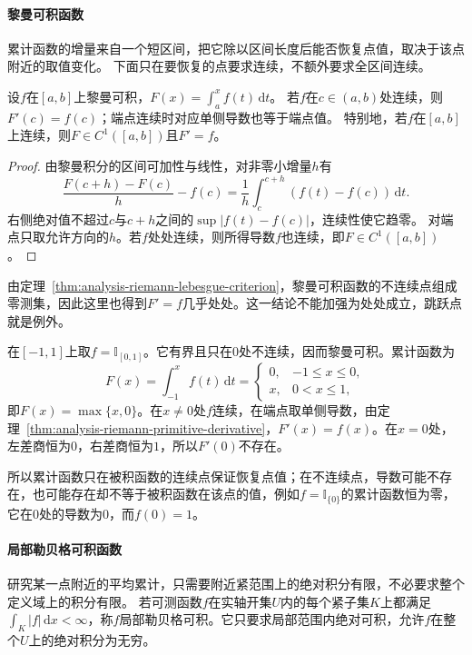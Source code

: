 \paragraph{黎曼可积函数}
累计函数的增量来自一个短区间，把它除以区间长度后能否恢复点值，取决于该点附近的取值变化。
下面只在要恢复的点要求连续，不额外要求全区间连续。
\begin{theorem}[黎曼累计函数在连续点的导数]
\label{thm:analysis-riemann-primitive-derivative}
设$f$在$[a,b]$上黎曼可积，$F(x)=\int_a^xf(t)\,\mathrm dt$。
若$f$在$c\in(a,b)$处连续，则$F'(c)=f(c)$；端点连续时对应单侧导数也等于端点值。
特别地，若$f$在$[a,b]$上连续，则$F\in C^1([a,b])$且$F'=f$。
\end{theorem}
\begin{proof}
由黎曼积分的区间可加性与线性，对非零小增量$h$有
\[
 \frac{F(c+h)-F(c)}h-f(c)
 =\frac1h\int_c^{c+h}(f(t)-f(c))\,\mathrm dt.
\]
右侧绝对值不超过$c$与$c+h$之间的$\sup|f(t)-f(c)|$，连续性使它趋零。
对端点只取允许方向的$h$。若$f$处处连续，则所得导数$f$也连续，即$F\in C^1([a,b])$。
\end{proof}

由定理~\ref{thm:analysis-riemann-lebesgue-criterion}，黎曼可积函数的不连续点组成零测集，因此这里也得到$F'=f$几乎处处。这一结论不能加强为处处成立，跳跃点就是例外。
\begin{example}[阶跃函数的累计函数在跳跃点不可导]
\label{ex:analysis-step-primitive}
在$[-1,1]$上取$f=\mathbb I_{[0,1]}$。它有界且只在$0$处不连续，因而黎曼可积。累计函数为
\[
 F(x)=\int_{-1}^xf(t)\,\mathrm dt=
 \begin{cases}
  0,&-1\leq x\leq0,\\
  x,&0<x\leq1,
 \end{cases}
\]
即$F(x)=\max\{x,0\}$。在$x\neq0$处$f$连续，在端点取单侧导数，由定理~\ref{thm:analysis-riemann-primitive-derivative}，$F'(x)=f(x)$。在$x=0$处，左差商恒为$0$，右差商恒为$1$，所以$F'(0)$不存在。
\end{example}
所以累计函数只在被积函数的连续点保证恢复点值；在不连续点，导数可能不存在，也可能存在却不等于被积函数在该点的值，例如$f=\mathbb I_{\{0\}}$的累计函数恒为零，它在$0$处的导数为$0$，而$f(0)=1$。

\paragraph{局部勒贝格可积函数}
研究某一点附近的平均累计，只需要附近紧范围上的绝对积分有限，不必要求整个定义域上的积分有限。
若可测函数$f$在实轴开集$U$内的每个紧子集$K$上都满足$\int_K|f|\,\mathrm dx<\infty$，称$f$局部勒贝格可积。它只要求局部范围内绝对可积，允许$f$在整个$U$上的绝对积分为无穷。

